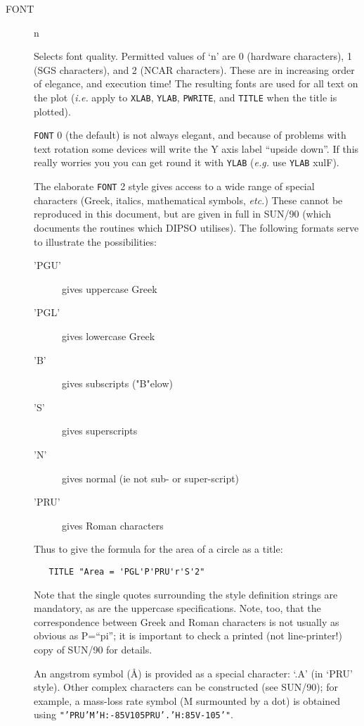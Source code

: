 \documentclass[twoside,11pt]{article}
\newcommand{\htmlref}[2]{#1}
\newcommand{\xref}[3]{#1}
\newcommand{\xlabel}[1]{}
\renewcommand{\_}{\texttt{\symbol{95}}}
\newcommand{\dipcom}[3] { \item [{#1}] {#2} \par }
\newenvironment{dipdesc}{\begin{description}}{\end{description}}
\newcommand{\dipitem}[2]{ \item[{#1}] {#2} }
\newcommand{\dipcom}[3] { \end{description}
                            \subsection{\xlabel{#1}{#1} - {#3}}
                            \label{COM:#1}
                            \begin{description}
                            \item [Syntax:] {\tt{#1} {#2}}
                            \par
                            \item [Description:]}
\newenvironment{dipdesc}{\begin{itemize}}{\end{itemize}}
\newcommand{\dipitem}[2]{ \item {\bf{#1}} {#2} }
\begin{document}
\begin {description}
\dipcom{FONT}{n}{Selects font quality}
Selects font quality. Permitted values of `n' are 0 (hardware
characters), 1 (SGS characters), and 2 (NCAR characters). These are in
increasing order of elegance, and execution time! The resulting fonts
are used for all text on the plot ({\em i.e.} apply to \htmlref{{\tt{XLAB}}}{COM:XLAB},  \htmlref{{\tt{YLAB}}}{COM:YLAB}, 
\htmlref{{\tt{PWRITE}}}{COM:PWRITE},  and \htmlref{{\tt{TITLE}}}{COM:TITLE}  when the title is plotted).

\htmlref{{\tt{FONT}}}{COM:FONT}  0 (the default) is not always elegant, and because of problems
with text rotation some devices will write the Y axis label ``upside
down''. If this really worries you you can get round it with \htmlref{{\tt{YLAB}}}{COM:YLAB} 
({\em e.g.} use \htmlref{{\tt{YLAB}}}{COM:YLAB}  xulF).

The elaborate \htmlref{{\tt{FONT}}}{COM:FONT}  2 style gives access to a wide range of special
characters (Greek, italics, mathematical symbols, {\em etc.}) These
cannot be reproduced in this document, but are given in full in
\xref{SUN/90}{sun90}{}
(which documents the routines which DIPSO utilises). The following
formats serve to illustrate the possibilities:

\begin{dipdesc}
\dipitem {'PGU'}{ gives uppercase Greek}
\dipitem {'PGL'}{ gives lowercase Greek}
\dipitem {'B'}{ gives subscripts ("B"elow)}
\dipitem {'S'}{ gives superscripts}
\dipitem {'N'}{ gives normal (ie not sub- or super-script)}
\dipitem {'PRU'}{ gives Roman characters}
\end{dipdesc}

Thus to give the formula for the area of a circle as a title:

\begin{verbatim}
   TITLE "Area = 'PGL'P'PRU'r'S'2"
\end{verbatim}

Note that the single quotes surrounding the style definition strings
are mandatory, as are the uppercase specifications. Note, too, that
the correspondence between Greek and Roman characters is not usually
as obvious as P=``pi''; it is important to check a printed (not
line-printer!) copy of \xref{SUN/90}{sun90}{} for details.

An angstrom symbol ({\AA}) is provided as a special character: `.A'
(in `PRU' style). Other complex characters can be constructed (see
\xref{SUN/90}{sun90}{}); for example, a mass-loss rate symbol (M surmounted by a dot)
is obtained using {\tt{"'PRU'M'H:-85V105PRU'.'H:85V-105'"}}. 


\end{description}
\end{document}
